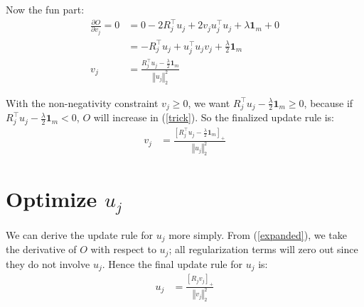 \documentclass{article}
\begin{document}
Now the fun part:
\begin{align}
\frac{\partial O}{\partial v_j} = 0 &=
0 - 2R^{\top}_j u_{j} + 2  v_{j} u^{\top}_{j} u_{j}
+ \lambda \boldsymbol{1}_m
+ 0 \\
&= -R^{\top}_j u_{j} 
+ u^{\top}_{j} u_{j}  v_{j}
+ \frac{\lambda}{2} \boldsymbol{1}_m
\\
v_{j} &= \frac{R^{\top}_j u_{j} - \frac{\lambda}{2} \boldsymbol{1}_m}{\left\Vert u_{j} \right\Vert_2^2}
\end{align}

With the non-negativity constraint $v_{j} \geq 0$, we want $R^{\top}_j u_{j} - \frac{\lambda}{2} \boldsymbol{1}_m \geq 0$, because if $R^{\top}_j u_{j} - \frac{\lambda}{2} \boldsymbol{1}_m < 0$, $O$ will increase in (\ref{trick}). So the finalized update rule is:
\begin{align}
v_{j} &=\frac{ \left[ R^{\top}_j u_{j} - \frac{\lambda}{2} \boldsymbol{1}_m \right]_+}{\left\Vert u_{j} \right\Vert_2^2}
\end{align}

\section*{Optimize $u_{j}$}
We can derive the update rule for $u_{j}$ more simply.  From (\ref{expanded}), we take the derivative of $O$ with respect to $u_j$; all regularization terms will zero out since they do not involve $u_j$. Hence the final update rule for $u_j$ is:
\begin{align}
u_j&= \frac{\left[ R_j v_j \right]_+ }{\left\Vert v_j \right\Vert_2^2 }
\end{align}
\end{document}
